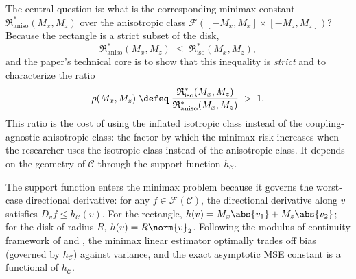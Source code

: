 The central question is: what is the corresponding minimax constant $\mathfrak{R}^*_{\mathrm{aniso}}(M_x, M_z)$ over the anisotropic class $\mathcal{F}([-M_x, M_x] \times [-M_z, M_z])$?
Because the rectangle is a strict subset of the disk,
\begin{equation*}
	\mathfrak{R}^*_{\mathrm{aniso}}(M_x, M_z) \;\leq\; \mathfrak{R}^*_{\mathrm{iso}}(M_x, M_z),
\end{equation*}
and the paper's technical core is to show that this inequality is \emph{strict} and to characterize the ratio
\begin{equation*}
	\rho(M_x, M_z) \;\defeq\; \frac{\mathfrak{R}^*_{\mathrm{iso}}(M_x, M_z)}{\mathfrak{R}^*_{\mathrm{aniso}}(M_x, M_z)} \;>\; 1.
\end{equation*}
This ratio is the cost of using the inflated isotropic class instead of the coupling-agnostic anisotropic class: the factor by which the minimax risk increases when the researcher uses the isotropic class instead of the anisotropic class.
It depends on the geometry of $\mathcal{C}$ through the support function $h_{\mathcal{C}}$.

The support function enters the minimax problem because it governs the worst-case directional derivative: for any $f \in \mathcal{F}(\mathcal{C})$, the directional derivative along $v$ satisfies $D_v f \leq h_{\mathcal{C}}(v)$.
For the rectangle, $h(v) = M_x \abs{v_1} + M_z \abs{v_2}$; for the disk of radius $R$, $h(v) = R \norm{v}_2$.
Following the modulus-of-continuity framework of \textcite{donoho_statistical_1994} and \textcite{armstrong_simple_2020}, the minimax linear estimator optimally trades off bias (governed by $h_{\mathcal{C}}$) against variance, and the exact asymptotic MSE constant is a functional of $h_{\mathcal{C}}$.

